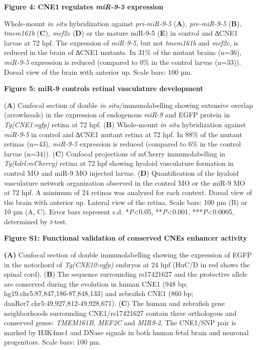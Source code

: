 \documentclass[]{article}
\begin{document}
\textbf{Figure 4: CNE1 regulates \emph{miR-9-5} expression }

Whole-mount \emph{in situ} hybridization against \emph{pri-miR-9-5}
(\textbf{A})\emph{, pre-miR-9-5} (\textbf{B})\emph{, tmem161b}
(\textbf{C})\emph{, mef2c} (\textbf{D}) or the mature miR-9-5
(\textbf{E}) in control and ∆CNE1 larvae at 72 hpf. The expression of
\emph{miR-9-5}, but not \emph{tmem161b} and \emph{mef2c}, is reduced in
the brain of ∆CNE1 mutants. In 31\% of the mutant brains (n=36),
\emph{miR-9-5} expression is reduced (compared to 0\% in the control
larvae (n=33)). Dorsal view of the brain with anterior up. Scale bars:
100 µm.

\textbf{Figure 5: miR-9 controls retinal vasculature development}

(\textbf{A}) Confocal section of double \emph{in situ}/immunolabelling
showing extensive overlap (arrowheads) in the expression of endogenous
\emph{miR-9} and EGFP protein in \emph{Tg(CNE1:egfp)} retina at 72 hpf.
(\textbf{B}) Whole-mount \emph{in situ} hybridization against
\emph{miR-9-5} in control and ∆CNE1 mutant retina at 72 hpf. In 88\% of
the mutant retinas (n=43), \emph{miR-9-5} expression is reduced
(compared to 6\% in the control larvae (n=34)). (\textbf{C}) Confocal
projections of mCherry immunolabelling in \emph{Tg(kdrl:mCherry)} retina
at 72 hpf showing hyaloid vasculature formation in control MO and miR-9
MO injected larvae. (\textbf{D}) Quantification of the hyaloid
vasculature network organization observed in the control MO or the miR-9
MO at 72 hpf. A minimum of 24 retinas was analyzed for each context.
Dorsal view of the brain with anterior up. Lateral view of the retina.
Scale bars: 100 µm (B) or 10 µm (A, C). Error bars represent s.d.
*\emph{P}\textless{}0.05, **\emph{P}\textless{}0.001,
***\emph{P}\textless{}0.0005, determined by \emph{t}-test.

\textbf{Figure S1: Functional validation of conserved CNEs enhancer
activity }

\textbf{(A)} Confocal section of double immunolabelling showing the
expression of EGFP in the notochord of \emph{Tg(CNE10:egfp)} embryos at
24 hpf (HuC/D in red shows the spinal cord). (\textbf{B}) The sequence
surrounding rs17421627 and the protective allele are conserved during
the evolution in human CNE1 (948 bp; hg19.chr5:87,847,186-87,848,133)
and zebrafish CNE1 (860 bp; danRer7.chr5:49,927,812-49,928,671).
(\textbf{C}) The human and zebrafish gene neighborhoods surrounding
CNE1/rs17421627 contain three orthologous and conserved genes:
\emph{TMEM161B}, \emph{MEF2C} and \emph{MIR9-2}. The CNE1/SNP pair is
marked by H3K4me1 and DNase signals in both human fetal brain and
neuronal progenitors. Scale bars: 100 µm.
\end{document}
